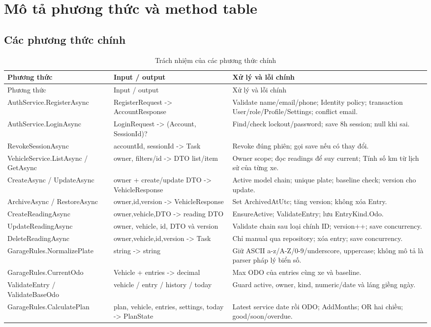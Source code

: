\section{Mô tả phương thức và method table}
\subsection{Các phương thức chính}
\begin{smalltable}\begin{longtable}{L{4.2cm}L{4.2cm}L{6.2cm}}
\caption{Trách nhiệm của các phương thức chính}\label{tab:methods-current}\\\toprule Phương thức & Input / output & Xử lý và lỗi chính\\\midrule\endfirsthead
\toprule Phương thức & Input / output & Xử lý và lỗi chính\\\midrule\endhead
AuthService.RegisterAsync & RegisterRequest -> AccountResponse & Validate name/email/phone; Identity policy; transaction User/role/Profile/Settings; conflict email.\\
AuthService.LoginAsync & LoginRequest -> (Account, SessionId)? & Find/check lockout/password; save 8h session; null khi sai.\\
RevokeSessionAsync & accountId, sessionId -> Task & Revoke đúng phiên; gọi save nếu có thay đổi.\\
VehicleService.ListAsync / GetAsync & owner, filters/id -> DTO list/item & Owner scope; đọc readings để suy current; Tính số km từ lịch sử của từng xe.\\
CreateAsync / UpdateAsync & owner + create/update DTO -> VehicleResponse & Active model chain; unique plate; baseline check; version cho update.\\
ArchiveAsync / RestoreAsync & owner,id,version -> VehicleResponse & Set ArchivedAtUtc; tăng version; không xóa Entry.\\
CreateReadingAsync & owner,vehicle,DTO -> reading DTO & EnsureActive; ValidateEntry; lưu EntryKind.Odo.\\
UpdateReadingAsync & owner, vehicle, id, DTO và version & Validate chain sau loại chính ID; version++; save concurrency.\\
DeleteReadingAsync & owner,vehicle,id,version -> Task & Chỉ manual qua repository; xóa entry; save concurrency.\\
GarageRules.\allowbreak NormalizePlate & string -> string & Giữ ASCII a-z/A-Z/0-9/underscore, uppercase; không mô tả là parser pháp lý biển số.\\
GarageRules.CurrentOdo & Vehicle + entries -> decimal & Max ODO của entries cùng xe và baseline.\\
ValidateEntry / ValidateBaseOdo & vehicle / entry / history / today & Guard active, owner, kind, numeric/date và láng giềng ngày.\\
GarageRules.\allowbreak CalculatePlan & plan, vehicle, entries, settings, today -> PlanState & Latest service date rồi ODO; AddMonths; OR hai chiều; good/soon/overdue.\\\bottomrule
\end{longtable}\end{smalltable}


